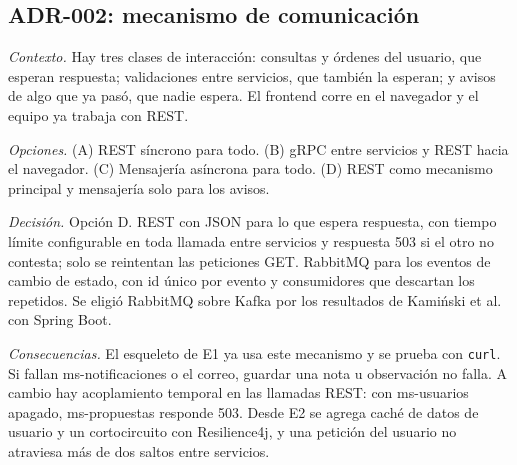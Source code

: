 \subsection{ADR-002: mecanismo de comunicación}

\textit{Contexto.} Hay tres clases de interacción: consultas y órdenes del usuario, que esperan respuesta; validaciones entre servicios, que también la esperan; y avisos de algo que ya pasó, que nadie espera. El frontend corre en el navegador y el equipo ya trabaja con REST.

\textit{Opciones.} (A) REST síncrono para todo. (B) gRPC entre servicios y REST hacia el navegador. (C) Mensajería asíncrona para todo. (D) REST como mecanismo principal y mensajería solo para los avisos.

\textit{Decisión.} Opción D. REST con JSON para lo que espera respuesta, con tiempo límite configurable en toda llamada entre servicios y respuesta 503 si el otro no contesta; solo se reintentan las peticiones GET. RabbitMQ para los eventos de cambio de estado, con id único por evento y consumidores que descartan los repetidos. Se eligió RabbitMQ sobre Kafka por los resultados de Kamiński et al.~\cite{kaminski2025rabbitmq} con Spring Boot.

\textit{Consecuencias.} El esqueleto de E1 ya usa este mecanismo y se prueba con \texttt{curl}. Si fallan ms-notificaciones o el correo, guardar una nota u observación no falla. A cambio hay acoplamiento temporal en las llamadas REST: con ms-usuarios apagado, ms-propuestas responde 503. Desde E2 se agrega caché de datos de usuario y un cortocircuito con Resilience4j, y una petición del usuario no atraviesa más de dos saltos entre servicios.
